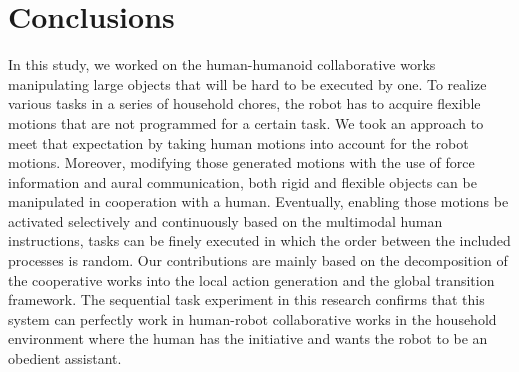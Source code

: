 \section{Conclusions}
In this study, we worked on the human-humanoid collaborative works manipulating large objects that will be hard to be executed by one. To realize various tasks in a series of household chores, the robot has to acquire flexible motions that are not programmed for a certain task. We took an approach to meet that expectation by taking human motions into account for the robot motions. Moreover, modifying those generated motions with the use of force information and aural communication, both rigid and flexible objects can be manipulated in cooperation with a human. Eventually, enabling those motions be activated selectively and continuously based on the multimodal human instructions, tasks can be finely executed in which the order between the included processes is random.
Our contributions are mainly based on the decomposition of the cooperative works into the local action generation and the global transition framework. The sequential task experiment in this research confirms that this system can perfectly work in human-robot collaborative works in the household environment where the human has the initiative and wants the robot to be an obedient assistant.
